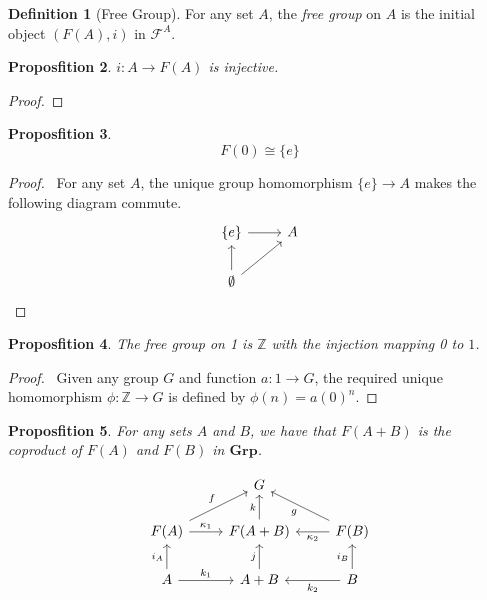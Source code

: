 \documentclass{book}
\let\qed\relax
\newtheorem{prop}{Proposfition}[chapter]
\theoremstyle{definition}
\newtheorem{df}[prop]{Definition}
\newcommand{\Grp}{\ensuremath{\mathbf{Grp}}}
\begin{document}
\begin{df}[Free Group]
    For any set $A$, the \emph{free group} on $A$ is the initial object $(F(A),i)$ in $\mathcal{F}^A$.
\end{df}

\begin{prop}
    $i : A \rightarrow F(A)$ is injective.
\end{prop}

\begin{proof}
    \pf
    \qed
\end{proof}

\begin{prop}
    \[ F(0) \cong \{e\} \]
\end{prop}

\begin{proof}
    \pf\ For any set $A$, the unique group homomorphism $\{e\} \rightarrow A$ makes the following diagram commute.
    \[ \begin{tikzcd}
            \{e\} \arrow[r] & A \\
            \emptyset \arrow[u] \arrow[ur]
        \end{tikzcd} \]
\end{proof}

\begin{prop}
    The free group on 1 is $\mathbb{Z}$ with the injection mapping 0 to $1$.
\end{prop}

\begin{proof}
    \pf\ Given any group $G$ and function $a : 1 \rightarrow G$, the required unique homomorphism $\phi : \mathbb{Z} \rightarrow G$ is defined by $\phi(n) = a(0)^n$. \qed
\end{proof}

\begin{prop}
    For any sets $A$ and $B$, we have that $F(A+B)$ is the coproduct of $F(A)$ and $F(B)$ in $\Grp$.
\end{prop}

\[ \begin{tikzcd}
        & G & \\
        F(A) \arrow[r,"\kappa_1"] \arrow[ur,"f"] & F(A+B) \arrow[u,"k"] & \arrow[l,"\kappa_2"] F(B) \arrow[ul,"g"] \\
        A \arrow[r,"k_1"] \arrow[u,"i_A"] & A+B \arrow[u,"j"] & \arrow[l,"k_2"] \arrow[u,"i_B"] B
    \end{tikzcd} \]
\end{document}
